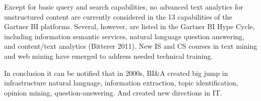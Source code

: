 Except for basic query and search capabilities, no advanced
text analytics for unstructured content are currently considered in the 13 capabilities of the Gartner BI platforms.
Several, however, are listed in the Gartner BI Hype Cycle,
including information semantic services, natural language
question answering, and content/text analytics (Bitterer 2011). 
New IS and CS courses in text mining and web mining have
emerged to address needed technical training.

In conclusion it can be notified that in 2000s, BI\&A created big jump in infrastructure natural language, information extraction, topic identification, opinion mining, question-answering. And created new directions in IT.
